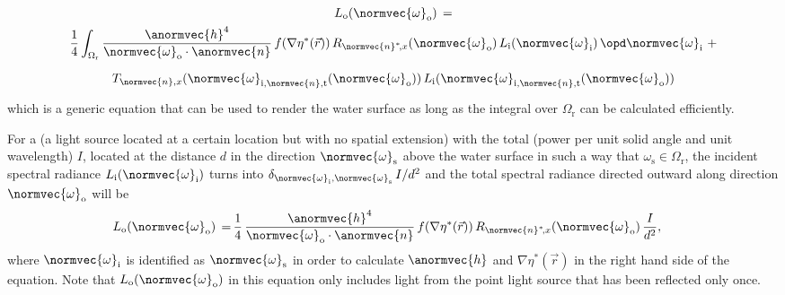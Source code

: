 \begin{equation} \label{eq:rendering_equation_simplified}
\renewcommand*{\arraystretch}{2}
\begin{array}{cl}
L_{\text{o}}(\normvec{\omega}_{\text{o}}) \,= \\
\displaystyle \frac{1}{4}\int_{\Omega_{\text{r}}} \frac{\anormvec{h}^4}{\normvec{\omega}_{\text{o}}\cdot\anormvec{n}}\,f(\nabla\eta^*(\vec{r}))\,R_{\normvec{n}^*\!,x}(\normvec{\omega}_{\text{o}})\, L_{\text{i}}(\normvec{\omega}_{\text{i}})\,\opd \normvec{\omega}_{\text{i}} \ + \\[1ex]
\displaystyle T_{\normvec{n},x}(\normvec{\omega}_{\text{i},\normvec{n},\text{t}}(\normvec{\omega}_{\text{o}}))\, L_{\text{i}}(\normvec{\omega}_{\text{i},\normvec{n},\text{t}}(\normvec{\omega}_{\text{o}}))
\end{array}
\end{equation}
%
which is a generic equation that can be used to render the water surface as long as the integral over $\Omega_{\text{r}}$ can be calculated efficiently.

For a  (a light source located at a certain location but with no spatial extension) with the total  (power per unit solid angle and unit wavelength) $I$, located at the distance $d$ in the direction $\normvec{\omega}_{\text{s}}$ above the water surface in such a way that $\omega_{\text{s}} \in \Omega_{\text{r}}$, the incident spectral radiance $L_{\text{i}}(\normvec{\omega}_{\text{i}})$ turns into $\delta_{\normvec{\omega}_{\text{i}},\normvec{\omega}_{\text{s}}}\,I/d^2$ and the total spectral radiance directed outward along direction $\normvec{\omega}_{\text{o}}$ will be
%
\begin{equation} \label{eq:spectral_radience_reflected_point_light_source}
\renewcommand*{\arraystretch}{2}
\begin{aligned}
\displaystyle L_{\text{o}}(\normvec{\omega}_{\text{o}}) \,=\, & \frac{1}{4}\,\frac{\anormvec{h}^4}{\normvec{\omega}_{\text{o}}\cdot\anormvec{n}}\,f(\nabla\eta^*(\vec{r}))\,R_{\normvec{n}^*\!,x}(\normvec{\omega}_{\text{o}})\,\frac{I}{d^2},
\end{aligned}
\end{equation}
%
where $\normvec{\omega}_{\text{i}}$ is identified as $\normvec{\omega}_{\text{s}}$ in order to calculate $\anormvec{h}$ and $\nabla\eta^*(\vec{r})$ in the right hand side of the equation. Note that $L_{\text{o}}(\normvec{\omega}_{\text{o}})$ in this equation only includes light from the point light source that has been reflected only once.

